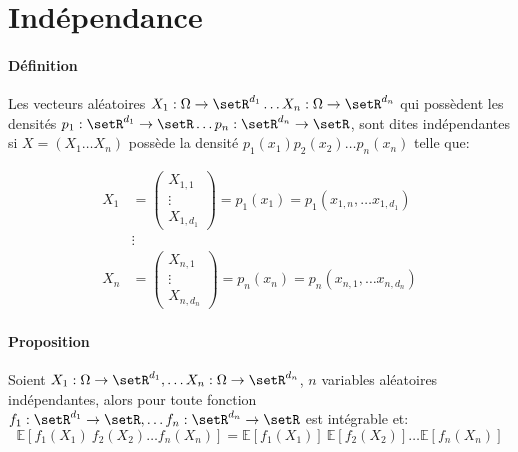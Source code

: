 \documentclass[a4paper,10pt,french,openany]{memoir}
\newcommand{\Esper}{\mathbb{E}}
\newcommand{\Xonen}{X_1\dots X_n}
\begin{document}
\section{Indépendance}

\paragraph{Définition}
Les vecteurs aléatoires $X_1:\Omega \rightarrow \setR^{d_1}\dots X_n:\Omega \rightarrow \setR^{d_n}$ qui possèdent les densités $p_1:\setR^{d_1}\rightarrow \setR\dots p_n:\setR^{d_n} \rightarrow \setR$, sont dites indépendantes si $X=(\Xonen)$ possède la densité $p_1(x_1) p_2(x_2) \dots p_n (x_n)$ telle que:

\begin{align*}
 X_1 &= \begin{pmatrix}X_{1,1}\\\vdots\\X_{1,d_1}\end{pmatrix} = p_1(x_1) = p_1(x_{1,n},\dots x_{1,d_1})\\
 & \vdots \\
 X_n &= \begin{pmatrix}X_{n,1}\\\vdots\\X_{n,d_n}\end{pmatrix} = p_n(x_n) = p_n(x_{n,1},\dots x_{n,d_n})
\end{align*}

\paragraph{Proposition}
Soient $X_1:\Omega \rightarrow \setR^{d_1}, \dots X_n:\Omega \rightarrow \setR^{d_n}$, $n$ variables aléatoires indépendantes, alors pour toute fonction $f_1:\setR^{d_1}\rightarrow \setR, \dots f_n:\setR^{d_n}\rightarrow \setR$ est intégrable et:
\[\Esper[f_1(X_1)\: f_2(X_2) \dots f_n(X_n)] = \Esper[f_1(X_1)]\: \Esper[f_2(X_2)] \dots \Esper[f_n(X_n)]\]
\end{document}
